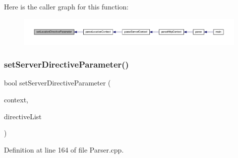 Here is the caller graph for this function\+:
\nopagebreak
\begin{figure}[H]
\begin{center}
\leavevmode
\includegraphics[width=350pt]{classft_1_1_parser_a82bee2278db1afa69bbb6eb6f192743c_icgraph}
\end{center}
\end{figure}
\mbox{\label{classft_1_1_parser_a18c1b12280ce1a16246a8ba09156116f}} 
\subsubsection{\texorpdfstring{set\+Server\+Directive\+Parameter()}{setServerDirectiveParameter()}}
{\footnotesize\ttfamily bool set\+Server\+Directive\+Parameter (\begin{DoxyParamCaption}\item[{\hyperlink{classft_1_1_server_block}{Server\+Block} \&}]{context,  }\item[{std\+::vector$<$ \hyperlink{classft_1_1_directive}{Directive} $>$}]{directive\+List }\end{DoxyParamCaption})}



Definition at line 164 of file Parser.\+cpp.


